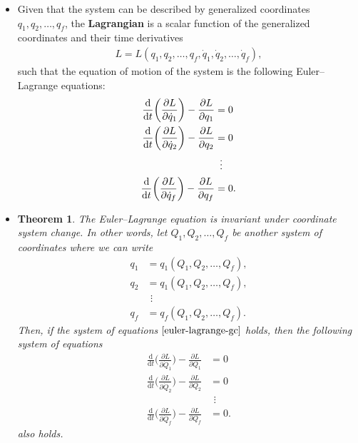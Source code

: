 \documentclass[10pt]{article}
\newtheorem{theorem}[lemma]{Theorem}
\newcommand{\dee}{\mathrm{d}}
\begin{document}
\begin{itemize}
  	\item Given that the system can be described by generalized coordinates $q_1, q_2, \dotsc, q_f$, the {\bf Lagrangian} is a scalar function of the generalized coordinates and their time derivatives
  	\begin{align*}
  		L = L(q_1, q_2, \dotsc, q_f, \dot{q}_1, \dot{q}_2, \dotsc, \dot{q}_f),
  	\end{align*}
  	such that the equation of motion of the system is the following Euler--Lagrange equations:
  	\begin{align}
  	\frac{\dee}{\dee t} \bigg( \frac{\partial L}{\partial \dot{q}_1} \bigg) - \frac{\partial L}{\partial q_1} &= 0 \notag \\
  	\frac{\dee}{\dee t} \bigg( \frac{\partial L}{\partial \dot{q}_2} \bigg) - \frac{\partial L}{\partial q_2} &= 0 \notag \\
  	&\ \,\vdots \label{euler-lagrange-gc} \\
  	\frac{\dee}{\dee t} \bigg( \frac{\partial L}{\partial \dot{q}_f} \bigg) - \frac{\partial L}{\partial q_f} &= 0. \notag
  	\end{align}

  	\item \begin{theorem} \label{lagrangian-change-of-coordiate}
  		The Euler--Lagrange equation is invariant under coordinate system change. In other words, let $Q_1, Q_2, \dotsc, Q_f$ be another system of coordinates where we can write
  		\begin{align*}
  			q_1 &= q_1(Q_1, Q_2, \dotsc, Q_f),\\
  			q_2 &= q_1(Q_1, Q_2, \dotsc, Q_f),\\
  			&\ \,\vdots \\
  			q_f &= q_f(Q_1, Q_2, \dotsc, Q_f).
  		\end{align*}
  		Then, if the system of equations $\eqref{euler-lagrange-gc}$ holds, then the following system of equations
  		\begin{align*}
	  	\frac{\dee}{\dee t} \bigg( \frac{\partial L}{\partial \dot{Q}_1} \bigg) - \frac{\partial L}{\partial Q_1} &= 0 \\
	  	\frac{\dee}{\dee t} \bigg( \frac{\partial L}{\partial \dot{Q}_2} \bigg) - \frac{\partial L}{\partial Q_2} &= 0 \\
	  	&\ \,\vdots \\
	  	\frac{\dee}{\dee t} \bigg( \frac{\partial L}{\partial \dot{Q}_f} \bigg) - \frac{\partial L}{\partial Q_f} &= 0.
	  	\end{align*}
	  	also holds.
  	\end{theorem}


\end{itemize}
\end{document}
